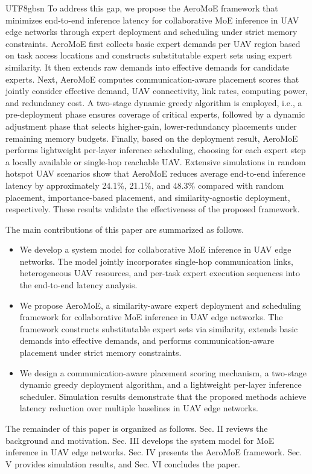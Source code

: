 \documentclass[journal]{IEEEtran}
\begin{document}
\begin{CJK*}{UTF8}{gbsn}
To address this gap, we propose the AeroMoE framework that minimizes end-to-end inference latency for collaborative MoE inference in UAV edge networks through expert deployment and scheduling under strict memory constraints. AeroMoE first collects basic expert demands per UAV region based on task access locations and constructs substitutable expert sets using expert similarity. It then extends raw demands into effective demands for candidate experts. Next, AeroMoE computes communication-aware placement scores that jointly consider effective demand, UAV connectivity, link rates, computing power, and redundancy cost. A two-stage dynamic greedy algorithm is employed, i.e., a pre-deployment phase ensures coverage of critical experts, followed by a dynamic adjustment phase that selects higher-gain, lower-redundancy placements under remaining memory budgets. Finally, based on the deployment result, AeroMoE performs lightweight per-layer inference scheduling, choosing for each expert step a locally available or single-hop reachable UAV. Extensive simulations in random hotspot UAV scenarios show that AeroMoE reduces average end-to-end inference latency by approximately 24.1\%, 21.1\%, and 48.3\% compared with random placement, importance-based placement, and similarity-agnostic deployment, respectively. These results validate the effectiveness of the proposed framework.

The main contributions of this paper are summarized as follows.
\begin{itemize}
  \item We develop a system model for collaborative MoE inference in UAV edge networks. The model jointly incorporates single-hop communication links, heterogeneous UAV resources, and per-task expert execution sequences into the end-to-end latency analysis.
  \item We propose AeroMoE, a similarity-aware expert deployment and scheduling framework for collaborative MoE inference in UAV edge networks. The framework constructs substitutable expert sets via similarity, extends basic demands into effective demands, and performs communication-aware placement under strict memory constraints.
  \item We design a communication-aware placement scoring mechanism, a two-stage dynamic greedy deployment algorithm, and a lightweight per-layer inference scheduler. Simulation results demonstrate that the proposed methods achieve latency reduction over multiple baselines in UAV edge networks.
\end{itemize}
The remainder of this paper is organized as follows. Sec. II reviews the background and motivation. Sec. III develops the system model for MoE inference in UAV edge networks. Sec. IV presents the AeroMoE framework. Sec. V provides simulation results, and Sec. VI concludes the paper.

\end{CJK*}
\end{document}
